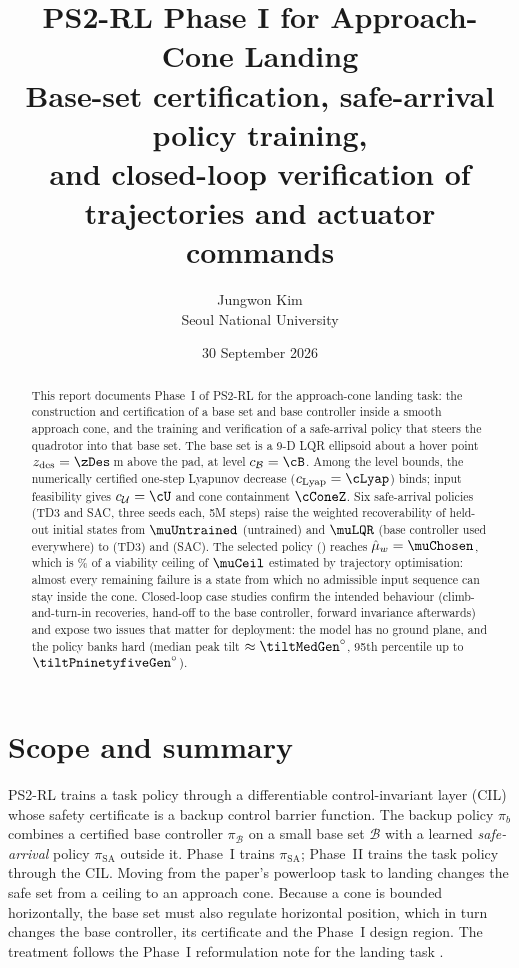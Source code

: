 \documentclass[11pt,a4paper]{article}
\title{\textbf{PS2-RL Phase I for Approach-Cone Landing}\\[4pt]
\large Base-set certification, safe-arrival policy training,\\ and closed-loop verification of trajectories and actuator commands}
\author{Jungwon Kim\\ \small Seoul National University}
\date{30 September 2026}
\newcommand{\B}{\mathcal{B}}
\newcommand{\U}{\mathcal{U}}
\newcommand{\zd}{z_{\mathrm{des}}}
\begin{document}
\maketitle

\begin{abstract}
\noindent
This report documents Phase~I of PS2-RL for the approach-cone landing task: the construction and
certification of a base set and base controller inside a smooth approach cone, and the training and
verification of a safe-arrival policy that steers the quadrotor into that base set. The base set is a
9-D LQR ellipsoid about a hover point $\zd=\zDes$\,m above the pad, at level $c_{\B}=\cB$. Among
the level bounds, the numerically certified one-step Lyapunov decrease ($c_{\mathrm{Lyap}}=\cLyap$) binds;
input feasibility gives $c_{\U}=\cU$ and cone containment $\cConeZ$. Six safe-arrival policies (TD3 and SAC,
three seeds each, 5M steps) raise the weighted recoverability of held-out initial states from
$\muUntrained$ (untrained) and $\muLQR$ (base controller used everywhere) to \muTDthree{} (TD3) and
\muSAC{} (SAC). The selected policy (\runChosen) reaches $\hat\mu_w=\muChosen$, which is \fracOfCeil\% of a
viability ceiling of $\muCeil$ estimated by trajectory optimisation: almost every remaining failure is a
state from which no admissible input sequence can stay inside the cone. Closed-loop case studies confirm
the intended behaviour (climb-and-turn-in recoveries, hand-off to the base controller, forward invariance
afterwards) and expose two issues that matter for deployment: the model has no ground plane, and the
policy banks hard (median peak tilt $\approx\tiltMedGen^\circ$, 95th percentile up to $\tiltPninetyfiveGen^\circ$).
\end{abstract}

\tableofcontents
\newpage

\section{Scope and summary}

PS2-RL \cite{ps2rl} trains a task policy through a differentiable control-invariant layer (CIL) whose
safety certificate is a backup control barrier function. The backup policy $\pi_b$ combines a
certified base controller $\pi_{\B}$ on a small base set $\B$ with a learned \emph{safe-arrival}
policy $\pi_{\mathrm{SA}}$ outside it. Phase~I trains $\pi_{\mathrm{SA}}$; Phase~II trains the task
policy through the CIL. Moving from the paper's powerloop task to landing changes the safe set from a
ceiling to an approach cone. Because a cone is bounded horizontally, the base set must also regulate
horizontal position, which in turn changes the base controller, its certificate and the Phase~I design region.
The treatment follows the Phase~I reformulation note for the landing task \cite{landingnote}.
\end{document}
